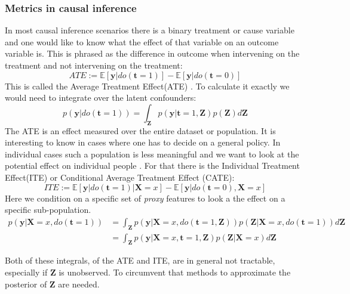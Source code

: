 \documentclass{article}
\newcommand{\E}{\mathbb{E}}
\newcommand{\bt}{\mathbf{t}}
\newcommand{\bX}{\mathbf{X}}
\newcommand{\by}{\mathbf{y}}
\newcommand{\bZ}{\mathbf{Z}}
\begin{document}
\subsubsection*{Metrics in causal inference}
In most causal inference scenarios there is a binary treatment or cause variable and one would like to know what the effect of that variable on an outcome variable is. This is phrased as the difference in outcome when intervening on the treatment and not intervening on the treatment: $$ATE := \E[\by|do(\bt=1)] - \E[\by | do(\bt=0)]$$This is called the Average Treatment Effect(ATE) \cite{shalit2017estimating}\cite{johansson2016learning}\cite{kunzel2019metalearners}. To calculate it exactly we would need to integrate over the latent confounders:
$$
    p(\by|do(\bt=1)) = \int_\bZ p(\by|\bt=1, \bZ) p(\bZ) d \bZ    
$$
The ATE is an effect measured over the entire dataset or population. It is interesting to know in cases where one has to decide on a general policy. In individual cases such a population is less meaningful and we want to look at the potential effect on individual people \cite{shalit2017estimating}\cite{johansson2016learning}\cite{kunzel2019metalearners}. For that there is the Individual Treatment Effect(ITE) or Conditional Average Treatment Effect (CATE): $$ITE := \E[\by|do(\bt=1)|\bX=x] - \E[\by | do(\bt=0), \bX=x]$$ Here we condition on a specific set of \textit{proxy} features to look a the effect on a specific sub-population. 
\begin{equation}\label{equation:intervention_with_proxy}
    \begin{split}
    p(\by | \bX=x, do(\bt=1)) &= \int_\bZ p(\by | \bX=x, do(\bt=1, \bZ)) p(\bZ | \bX=x, do(\bt = 1)) d\bZ \\
                            &= \int_\bZ p(\by | \bX=x, \bt = 1, \bZ) p(\bZ | \bX=x) d\bZ
    \end{split}
\end{equation}

\noindent
Both of these integrals, of the ATE and ITE, are in general not tractable, especially if $\bZ$ is unobserved. To circumvent that methods to approximate the posterior of $\bZ$ are needed.

\end{document}

